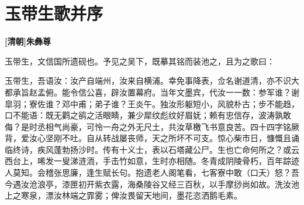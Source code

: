 \documentclass[UTF8,titlepage,oneside]{ctexbook}
\begin{document}
\chapter*{玉带生歌并序}
\begin{center}
	\textbf{[清朝]朱彝尊}
\end{center}


玉带生，文信国所遗砚也。予见之吴下，既摹其铭而装池之，且为之歌曰：


玉带生，吾语汝：汝产自端州，汝来自横浦。幸免事降表，佥名谢道清，亦不识大都承旨赵孟俯。能令信公喜，辟汝置幕府。当年文墨宾，代汝一一数：参军谁？谢皐羽；寮佐谁？邓中甫；弟子谁？王炎午。独汝形躯短小，风貌朴古；步不能趋，口不能语：既无鹳之鹆之活眼睛，兼少犀纹彪纹好眉妩；赖有忠信存，波涛孰敢侮？是时丞相气尚豪，可怜一舟之外无尺土，共汝草檄飞书意良苦。四十四字铭厥背，爱汝心坚刚不吐。自从转战屡丧师，天之所坏不可支。惊心柴市日，慷慨且诵临终诗，疾风蓬勃扬沙时。传有十义士，表以石塔藏公尸。生也亡命何所之？或云西台上，唏发一叟涕涟洏，手击竹如意，生时亦相随。冬青成阴陵骨朽，百年踪迹人莫知。会稽张思廉，逢生赋长句。抱遗老人阁笔看，七客寮中敢（口夭）怒？吾今遇汝沧浪亭，漆匣初开紫衣露，海桑陵谷又经三百秋，以手摩挱尚如故。洗汝池上之寒泉，漂汝林端之霏雾；俾汝畏留天地间，墨花恣洒鹅毛素。
\end{document}
